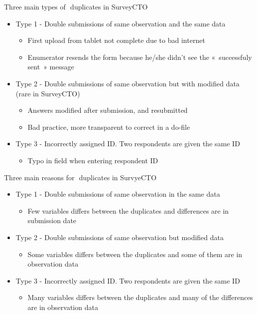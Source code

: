 \documentclass[aspectratio=169]{beamer}
\begin{document}
\begin{frame}{Three main types of  duplicates in SurveyCTO }
\begin{itemize}
	\item Type 1 - Double submissions of same observation and the same data
		\begin{itemize}
			\item First upload from tablet not complete due to bad internet
			\item Enumerator resends the form because he/she didn’t see the « successfuly sent » message
		\end{itemize}
	\item Type 2 - Double submissions of same observation but with modified data (rare in SurveyCTO)
		\begin{itemize}
			\item Answers modified after submission, and resubmitted
			\item Bad practice, more transparent to correct in a do-file
		\end{itemize}
	\item Type 3 - Incorrectly assigned ID. Two respondents are given the same ID
		\begin{itemize}
			\item Typo in field when entering respondent ID
		\end{itemize}
\end{itemize}
\end{frame}

\begin{frame}{Three main reasons for  duplicates in SurvyeCTO }
\begin{itemize}
	\item Type 1 - Double submissions of same observation in the same data
	\begin{itemize}
		\item Few variables differs between the duplicates and differences are in submission date
	\end{itemize}
	\item Type 2 - Double submissions of same observation but modified data
	\begin{itemize}
		\item Some variables differs between the duplicates and some of them are in observation data
	\end{itemize}
	\item Type 3 - Incorrectly assigned ID. Two respondents are given the same ID
	\begin{itemize}
		\item Many variables differs between the duplicates and many of the differences are in observation data
	\end{itemize}
\end{itemize}
\end{frame}
\end{document}
